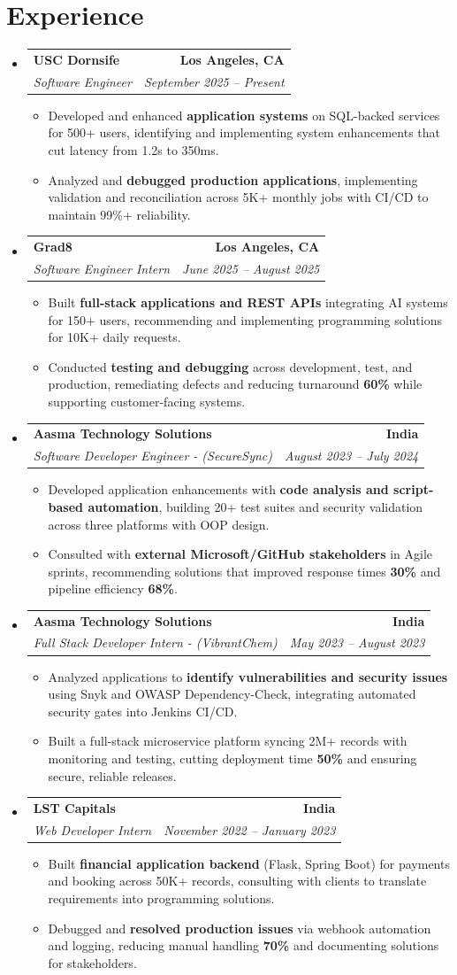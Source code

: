 \documentclass[letterpaper,10pt]{article}
\makeatletter
\newcommand{\resumeItem}[1]{\item\small{{#1 \vspace{-2pt}}}}
\newcommand{\resumeSubheading}[4]{\vspace{-1pt}\item\begin{tabular*}{1.0\textwidth}[t]{l@{\extracolsep{\fill}}r}\textbf{#1} & \textbf{\small #2} \\\textit{\small#3} & \textit{\small #4} \\\end{tabular*}\vspace{-2pt}}
\newcommand{\resumeSubHeadingListStart}{\begin{itemize}[leftmargin=0.0in, label={}]}
\newcommand{\resumeSubHeadingListEnd}{\end{itemize}}
\newcommand{\resumeItemListStart}{\begin{itemize}[leftmargin=0.15in,label=\textbullet,itemsep=2pt,topsep=0pt,parsep=0pt,partopsep=0pt]}
\newcommand{\resumeItemListEnd}{\end{itemize}\vspace{-4pt}}
\makeatother
\begin{document}
\section{Experience}
\resumeSubHeadingListStart
\resumeSubheading{USC Dornsife}{Los Angeles, CA}{Software Engineer}{September 2025 -- Present}
\resumeItemListStart
\resumeItem{Developed and enhanced \textbf{application systems} on SQL-backed services for 500+ users, identifying and implementing system enhancements that cut latency from 1.2s to 350ms.}
\resumeItem{Analyzed and \textbf{debugged production applications}, implementing validation and reconciliation across 5K+ monthly jobs with CI/CD to maintain 99\%+ reliability.}
\resumeItemListEnd
\resumeSubheading{Grad8}{Los Angeles, CA}{Software Engineer Intern}{June 2025 -- August 2025}
\resumeItemListStart
\resumeItem{Built \textbf{full-stack applications and REST APIs} integrating AI systems for 150+ users, recommending and implementing programming solutions for 10K+ daily requests.}
\resumeItem{Conducted \textbf{testing and debugging} across development, test, and production, remediating defects and reducing turnaround \textbf{60\%} while supporting customer-facing systems.}
\resumeItemListEnd
\resumeSubheading{Aasma Technology Solutions}{India}{Software Developer Engineer - (SecureSync)}{August 2023 -- July 2024}
\resumeItemListStart
\resumeItem{Developed application enhancements with \textbf{code analysis and script-based automation}, building 20+ test suites and security validation across three platforms with OOP design.}
\resumeItem{Consulted with \textbf{external Microsoft/GitHub stakeholders} in Agile sprints, recommending solutions that improved response times \textbf{30\%} and pipeline efficiency \textbf{68\%}.}
\resumeItemListEnd
\resumeSubheading{Aasma Technology Solutions}{India}{Full Stack Developer Intern - (VibrantChem)}{May 2023 -- August 2023}
\resumeItemListStart
\resumeItem{Analyzed applications to \textbf{identify vulnerabilities and security issues} using Snyk and OWASP Dependency-Check, integrating automated security gates into Jenkins CI/CD.}
\resumeItem{Built a full-stack microservice platform syncing 2M+ records with monitoring and testing, cutting deployment time \textbf{50\%} and ensuring secure, reliable releases.}
\resumeItemListEnd
\resumeSubheading{LST Capitals}{India}{Web Developer Intern}{November 2022 -- January 2023}
\resumeItemListStart
\resumeItem{Built \textbf{financial application backend} (Flask, Spring Boot) for payments and booking across 50K+ records, consulting with clients to translate requirements into programming solutions.}
\resumeItem{Debugged and \textbf{resolved production issues} via webhook automation and logging, reducing manual handling \textbf{70\%} and documenting solutions for stakeholders.}
\resumeItemListEnd
\resumeSubHeadingListEnd
\vspace{-6pt}
\end{document}
